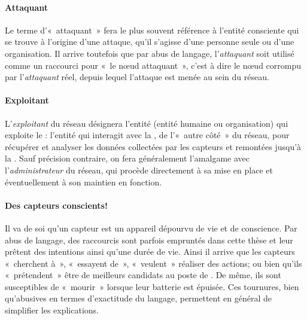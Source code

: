         \paragraph{Attaquant}
Le terme d'« attaquant » fera le plus souvent référence à l'entité consciente qui se trouve à l'origine d'une attaque, qu'il s'agisse d'une personne seule ou d'une organisation.
Il arrive toutefois que par abus de langage, l'\textit{attaquant} soit utilisé comme un raccourci pour « le nœud attaquant », c'est à dire le nœud corrompu par l'\textit{attaquant} réel, depuis lequel l'attaque est menée au sein du réseau.

        \paragraph{Exploitant}
L'\textit{exploitant} du réseau désignera l'entité (entité humaine ou organisation) qui exploite le \rcsfs: l'entité qui interagit avec la \sdb, de l'« autre côté » du réseau, pour récupérer et analyser les données collectées par les capteurs et remontées jusqu'à la \BS.
Sauf précision contraire, on fera généralement l'amalgame avec l'\textit{administrateur} du réseau, qui procède directement à sa mise en place et éventuellement à son maintien en fonction.

        \paragraph{Des capteurs conscients!}
Il va de soi qu'un capteur est un appareil dépourvu de vie et de conscience.
Par abus de langage, des raccourcis sont parfois empruntés dans cette thèse et leur prêtent des intentions ainsi qu'une durée de vie.
Ainsi il arrive que les capteurs « cherchent à », « essayent de », « veulent » réaliser des actions; ou bien qu'ils « prétendent » être de meilleurs candidats au poste de \ch.
De même, ils sont susceptibles de « mourir » lorsque leur batterie est épuisée.
Ces tournures, bien qu'abusives en termes d'exactitude du langage, permettent en général de simplifier les explications.

